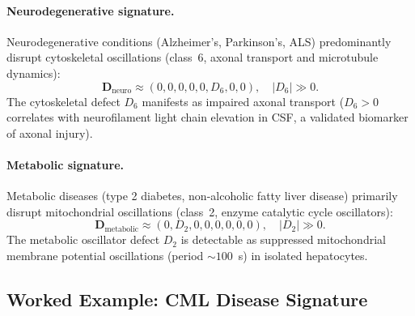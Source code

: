 \paragraph{Neurodegenerative signature.}
Neurodegenerative conditions (Alzheimer's, Parkinson's, ALS) predominantly
disrupt cytoskeletal oscillations (class~6, axonal transport and microtubule
dynamics):
\begin{equation}
    \mathbf{D}_{\mathrm{neuro}} \approx (0, 0, 0, 0, 0, D_6, 0, 0),
    \quad |D_6| \gg 0.
\end{equation}
The cytoskeletal defect $D_6$ manifests as impaired axonal transport
($D_6 > 0$ correlates with neurofilament light chain elevation in CSF,
a validated biomarker of axonal injury).

\paragraph{Metabolic signature.}
Metabolic diseases (type 2 diabetes, non-alcoholic fatty liver disease)
primarily disrupt mitochondrial oscillations (class~2, enzyme catalytic
cycle oscillators):
\begin{equation}
    \mathbf{D}_{\mathrm{metabolic}} \approx (0, D_2, 0, 0, 0, 0, 0, 0),
    \quad |D_2| \gg 0.
\end{equation}
The metabolic oscillator defect $D_2$ is detectable as suppressed
mitochondrial membrane potential oscillations (period $\sim 100$~s) in
isolated hepatocytes.

\subsection{Worked Example: CML Disease Signature}

